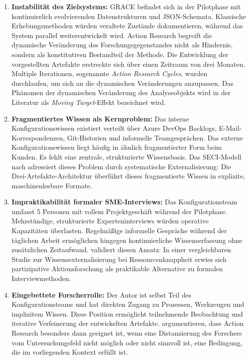 \begin{enumerate}
    \item \textbf{Instabilität des Zielsystems:} GRACE befindet sich in der Pilotphase mit kontinuierlich evolvierenden Datenstrukturen und JSON-Schemata. Klassische Erhebungsmethoden würden veraltete Zustände dokumentieren, während das System parallel weiterentwickelt wird. Action Research begreift die dynamische Veränderung des Forschungsgegenstandes nicht als Hindernis, sondern als konstitutiven Bestandteil der Methode. Die Entwicklung der vorgestellten Artefakte erstreckte sich über einen Zeitraum von drei Monaten. Multiple Iterationen, sogenannte \textit{Action Research Cycles}, wurden durchlaufen, um sich an die dynamischen Veränderungen anzupassen. Das Phänomen der dynamischen Veränderung des Analyseobjekts wird in der Literatur als \textit{Moving Target}-Effekt bezeichnet wird.

    \item \textbf{Fragmentiertes Wissen als Kernproblem:} Das interne Konfigurationswissen existiert verteilt über Azure DevOps Backlogs, E-Mail-Korrespondenzen, Git-Historien und informelle Teamgesprächen. Das externe Konfigurationswissen liegt häufig in ähnlich fragmentierter Form beim Kunden. Es fehlt eine zentrale, strukturierte Wissensbasis. Das SECI-Modell nach \cite{nonaka:knowledge_creating_company1995} adressiert dieses Problem durch systematische Externalisierung: Die Drei-Artefakte-Architektur überführt dieses fragmentierte Wissen in explizite, maschinenlesbare Formate.

    \item \textbf{Impraktikabilität formaler SME-Interviews:} Das Konfigurationsteam umfasst 5 Personen mit vollem Projektgeschäft während der Pilotphase. Mehrstündige, strukturierte Experteninterviews würden operative Kapazitäten überlasten. Regelmäßige informelle Gespräche während der täglichen Arbeit ermöglichen hingegen kontinuierliche Wissenserfassung ohne zusätzlichen Zeitaufwand. \cite{jackson:par2010} validiert diesen Ansatz: In einer vergleichbaren Studie zur Wissensexternalisierung bei Ressourcenknappheit erwies sich partizipative Aktionsforschung als praktikable Alternative zu formalen Interviewmethoden.

    \item \textbf{Eingebettete Forscherrolle:} Der Autor ist selbst Teil des Konfigurationsteams und hat direkten Zugang zu Prozessen, Werkzeugen und implizitem Wissen. Diese Position ermöglicht teilnehmende Beobachtung und iterative Verfeinerung der entwickelten Artefakte. \cite{susman:action_research1983} argumentieren, dass Action Research besonders dann geeignet ist, wenn eine Distanzierung des Forschers vom Untersuchungsfeld nicht möglich oder nicht sinnvoll ist, eine Bedingung, die im vorliegenden Kontext erfüllt ist.


\end{enumerate}
